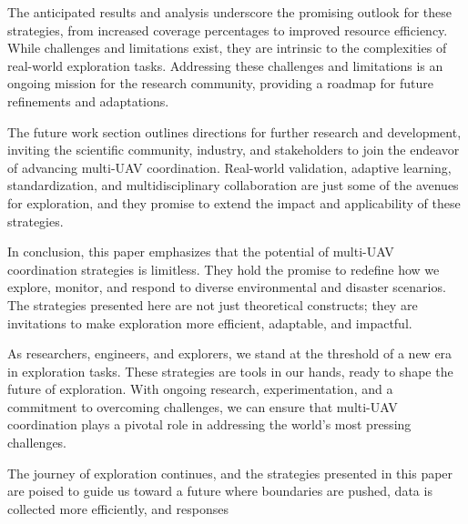 \documentclass[sigconf]{acmart}
\begin{document}
The anticipated results and analysis underscore the promising outlook for these strategies, from increased coverage percentages to improved resource efficiency. While challenges and limitations exist, they are intrinsic to the complexities of real-world exploration tasks. Addressing these challenges and limitations is an ongoing mission for the research community, providing a roadmap for future refinements and adaptations.

The future work section outlines directions for further research and development, inviting the scientific community, industry, and stakeholders to join the endeavor of advancing multi-UAV coordination. Real-world validation, adaptive learning, standardization, and multidisciplinary collaboration are just some of the avenues for exploration, and they promise to extend the impact and applicability of these strategies.

In conclusion, this paper emphasizes that the potential of multi-UAV coordination strategies is limitless. They hold the promise to redefine how we explore, monitor, and respond to diverse environmental and disaster scenarios. The strategies presented here are not just theoretical constructs; they are invitations to make exploration more efficient, adaptable, and impactful.

As researchers, engineers, and explorers, we stand at the threshold of a new era in exploration tasks. These strategies are tools in our hands, ready to shape the future of exploration. With ongoing research, experimentation, and a commitment to overcoming challenges, we can ensure that multi-UAV coordination plays a pivotal role in addressing the world's most pressing challenges.

The journey of exploration continues, and the strategies presented in this paper are poised to guide us toward a future where boundaries are pushed, data is collected more efficiently, and responses








\end{document}
